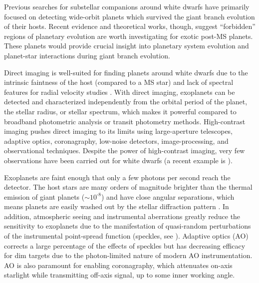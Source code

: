 \documentclass[twocolumn]{aastex631}
\begin{document}
Previous searches for substellar companions around white dwarfs \citep[e.g.,][]{debesAreThereUnstable2002,hoganDODOSurveyII2009,luhmanDiscoveryCandidateCoolest2011,xuExtremeAOSearchGiant2015a} have primarily focused on detecting wide-orbit planets which survived the giant branch evolution of their hosts. Recent evidence and theoretical works, though, suggest ``forbidden'' regions of planetary evolution are worth investigating for exotic post-MS planets. These planets would provide crucial insight into planetary system evolution and planet-star interactions during giant branch evolution.

Direct imaging is well-suited for finding planets around white dwarfs due to the intrinsic faintness of the host (compared to a MS star) and lack of spectral features for radial velocity studies \citep{burleighImagingPlanetsNearby2002a}. With direct imaging, exoplanets can be detected and characterized independently from the orbital period of the planet, the stellar radius, or stellar spectrum, which makes it powerful compared to broadband photometric analysis or transit photometry methods. High-contrast imaging pushes direct imaging to its limits using large-aperture telescopes, adaptive optics, coronagraphy, low-noise detectors, image-processing, and observational techniques. Despite the power of high-contrast imaging, very few observations have been carried out for white dwarfs (a recent example is \citealt{pathakHighContrastImaging2021}).

Exoplanets are faint enough that only a few photons per second reach the detector. The host stars are many orders of magnitude brighter than the thermal emission of giant planets ($\sim10^{\text{-}8}$) and have close angular separations, which means planets are easily washed out by the stellar diffraction pattern \citep{traubDirectImagingExoplanets2010}. In addition, atmospheric seeing and instrumental aberrations greatly reduce the sensitivity to exoplanets due to the manifestation of quasi-random perturbations of the instrumental point-spread function (speckles, see \citealp{guyonExtremeAdaptiveOptics2018}). Adaptive optics (AO) corrects a large percentage of the effects of speckles but has decreasing efficacy for dim targets due to the photon-limited nature of modern AO instrumentation. AO is also paramount for enabling coronagraphy, which attenuates on-axis starlight while transmitting off-axis signal, up to some inner working angle.
\end{document}
